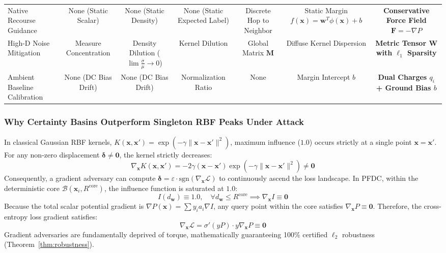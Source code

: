\documentclass[preprint,review,12pt]{elsarticle}
\begin{document}
\begin{table}[t]
{\begin{tabular}{lcccccc}
Native Recourse Guidance & None (Static Scalar) & None (Static Density) & None (Static Expected Label) & Discrete Hop to Neighbor & Static Margin $f(\mathbf{x}) = \mathbf{w}^T \phi(\mathbf{x})+b$ & \textbf{Conservative Force Field $\mathbf{F} = -\nabla P$} \\
High-D Noise Mitigation & Measure Concentration & Density Dilution ($\lim \frac{\sigma}{\mu} \to 0$) & Kernel Dilution & Global Matrix $\mathbf{M}$ & Diffuse Kernel Dispersion & \textbf{Metric Tensor $\mathbf{W}$ with $\ell_1$ Sparsity} \\
Ambient Baseline Calibration & None (DC Bias Drift) & None (DC Bias Drift) & Normalization Ratio & None & Margin Intercept $b$ & \textbf{Dual Charges $q_i$ + Ground Bias $b$} \\
\bottomrule
\end{tabular}
}
\end{table}

\subsubsection{Why Certainty Basins Outperform Singleton RBF Peaks Under Attack}
In classical Gaussian RBF kernels, $K(\mathbf{x}, \mathbf{x}') = \exp(-\gamma \|\mathbf{x} - \mathbf{x}'\|^2)$, maximum influence ($1.0$) occurs strictly at a single point $\mathbf{x} = \mathbf{x}'$. For any non-zero displacement $\boldsymbol{\delta} \ne \mathbf{0}$, the kernel strictly decreases:
\begin{equation}
    \nabla_{\mathbf{x}} K(\mathbf{x}, \mathbf{x}') = -2\gamma (\mathbf{x} - \mathbf{x}') \exp(-\gamma \|\mathbf{x} - \mathbf{x}'\|^2) \ne \mathbf{0}
\end{equation}
Consequently, a gradient adversary can compute $\boldsymbol{\delta} = \varepsilon \cdot \mathrm{sgn}(\nabla_{\mathbf{x}} \mathcal{L})$ to continuously ascend the loss landscape. In PFDC, within the deterministic core $\mathcal{B}(\mathbf{x}_i, R^{\mathrm{core}})$, the influence function is saturated at $1.0$:
\begin{equation}
    I(d_{\mathbf{w}}) \equiv 1.0, \quad \forall d_{\mathbf{w}} \le R^{\mathrm{core}} \implies \nabla_{\mathbf{x}} I \equiv \mathbf{0}
\end{equation}
Because the total scalar potential gradient is $\nabla P(\mathbf{x}) = \sum y_i a_i \nabla I$, any query point within the core satisfies $\nabla_{\mathbf{x}} P \equiv \mathbf{0}$. Therefore, the cross-entropy loss gradient satisfies:
\begin{equation}
    \nabla_{\mathbf{x}} \mathcal{L} = \sigma'(y P) \cdot y \nabla_{\mathbf{x}} P \equiv \mathbf{0}
\end{equation}
Gradient adversaries are fundamentally deprived of torque, mathematically guaranteeing 100\% certified $\ell_2$ robustness (Theorem~\ref{thm:robustness}).
\end{document}

